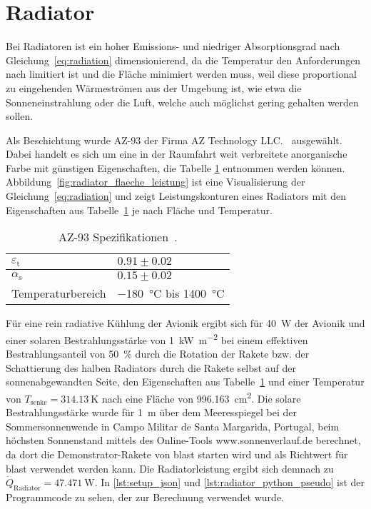 \section{Radiator}\label{sec:Radiator}

Bei Radiatoren ist ein hoher Emissions- und niedriger Absorptionsgrad nach Gleichung~\ref{eq:radiation} dimensionierend, da die Temperatur den Anforderungen nach limitiert ist
und die Fläche minimiert werden muss, weil diese proportional zu eingehenden Wärmeströmen aus der Umgebung ist, wie etwa die Sonneneinstrahlung oder die Luft, welche auch möglichst gering gehalten werden sollen.

Als Beschichtung wurde AZ-93 der Firma AZ Technology LLC.~\cite{AZ-Technology} ausgewählt. Dabei handelt es sich um eine in der Raumfahrt
weit verbreitete anorganische Farbe mit günstigen Eigenschaften, die Tabelle \ref{tab:az-93_eigenschaften} entnommen werden können.
Abbildung~\ref{fig:radiator_flaeche_leistung} ist eine Visualisierung der Gleichung~\ref{eq:radiation} und zeigt Leistungskonturen eines
Radiators mit den Eigenschaften aus Tabelle~\ref{tab:az-93_eigenschaften} je nach Fläche und Temperatur.

\begin{table}

  \centering
  \caption{AZ-93 Spezifikationen~\cite{AZ-Technology}.}\label{tab:az-93_eigenschaften}

  \begin{tabular}{ll}

    \toprule[1pt]
    $\varepsilon_{\text{t}}$ & $0.91 \pm 0.02$ \\

    \midrule[0.5pt]
    $\alpha_{\text{s}}$ & $0.15 \pm 0.02$ \\

    \midrule[0.5pt]
    Temperaturbereich  & \SI{-180}{\degreeCelsius} bis \SI{1400}{\degreeCelsius} \\

    \bottomrule[1pt]
  \end{tabular}
\end{table}

Für eine rein radiative Kühlung der Avionik ergibt sich für \SI{40}{\watt} der Avionik und einer solaren Bestrahlungsstärke von \SI{1}{\kilo\watt\per\meter\squared}
bei einem effektiven Bestrahlungsanteil von \SI{50}{\percent} durch die Rotation der Rakete bzw. der Schattierung des halben Radiators durch die Rakete selbst auf der sonnenabgewandten Seite, den Eigenschaften aus
Tabelle~\ref{tab:az-93_eigenschaften} und einer Temperatur von $T_\mathrm{senke} = \SI{314,13}{\kelvin}$
nach eine Fläche von \SI{996,163}{\centi\meter\squared}.
Die solare Bestrahlungsstärke wurde für \SI{1}{\meter} über dem Meeresspiegel bei der Sommersonnenwende in Campo Militar de Santa Margarida, Portugal, beim höchsten Sonnenstand
mittels des Online-Tools www.sonnenverlauf.de berechnet, da dort die Demonstrator-Rakete von \ac{blast} starten wird und als Richtwert für \ac{blast} verwendet werden kann.
Die Radiatorleistung ergibt sich demnach zu $\dot{Q}_\mathrm{Radiator} = \SI{47,471}{\watt}$.
In \ref{lst:setup_json} und \ref{lst:radiator_python_pseudo} ist der Programmcode zu sehen, der zur Berechnung verwendet wurde.

